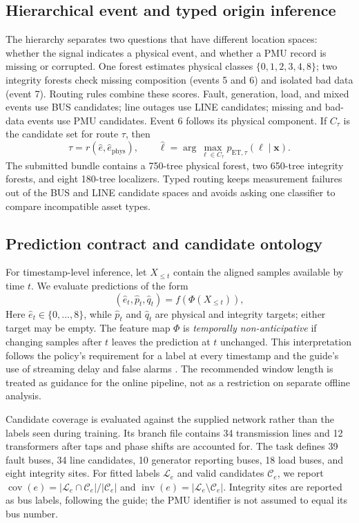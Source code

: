 \documentclass[conference]{IEEEtran}
\begin{document}
\subsection{Hierarchical event and typed origin inference}

The hierarchy separates two questions that have different location spaces: whether the signal indicates a physical event, and whether a PMU record is missing or corrupted. One forest estimates physical classes $\{0,1,2,3,4,8\}$; two integrity forests check missing composition (events 5 and 6) and isolated bad data (event 7). Routing rules combine these scores. Fault, generation, load, and mixed events use BUS candidates; line outages use LINE candidates; missing and bad-data events use PMU candidates. Event 6 follows its physical component. If $C_\tau$ is the candidate set for route $\tau$, then
\begin{equation}
\tau=r(\hat e,\hat e_{\mathrm{phys}}),\qquad
\hat\ell=\arg\max_{\ell\in C_\tau}p_{\mathrm{ET},\tau}(\ell\mid\mathbf{x}).
\label{eq:localizer}
\end{equation}
The submitted bundle contains a 750-tree physical forest, two 650-tree integrity forests, and eight 180-tree localizers. Typed routing keeps measurement failures out of the BUS and LINE candidate spaces and avoids asking one classifier to compare incompatible asset types.

\subsection{Prediction contract and candidate ontology}
For timestamp-level inference, let $X_{\leq t}$ contain the aligned samples available by time $t$. We evaluate predictions of the form
\begin{equation}
(\hat e_t,\hat p_t,\hat q_t)=f\!\left(\Phi(X_{\leq t})\right),
\label{eq:nonanticipation}
\end{equation}
Here $\hat e_t\in\{0,\ldots,8\}$, while $\hat p_t$ and $\hat q_t$ are physical and integrity targets; either target may be empty. The feature map $\Phi$ is \emph{temporally non-anticipative} if changing samples after $t$ leaves the prediction at $t$ unchanged. This interpretation follows the policy's requirement for a label at every timestamp and the guide's use of streaming delay and false alarms \cite{sgsmaGuide2026,sgsmaPolicy2026}. The recommended window length is treated as guidance for the online pipeline, not as a restriction on separate offline analysis.

Candidate coverage is evaluated against the supplied network rather than the labels seen during training. Its branch file contains 34 transmission lines and 12 transformers after taps and phase shifts are accounted for. The task defines 39 fault buses, 34 line candidates, 10 generator reporting buses, 18 load buses, and eight integrity sites. For fitted labels $\mathcal L_e$ and valid candidates $\mathcal C_e$, we report $\operatorname{cov}(e)=|\mathcal L_e\cap\mathcal C_e|/|\mathcal C_e|$ and $\operatorname{inv}(e)=|\mathcal L_e\setminus\mathcal C_e|$. Integrity sites are reported as bus labels, following the guide; the PMU identifier is not assumed to equal its bus number.
\end{document}
